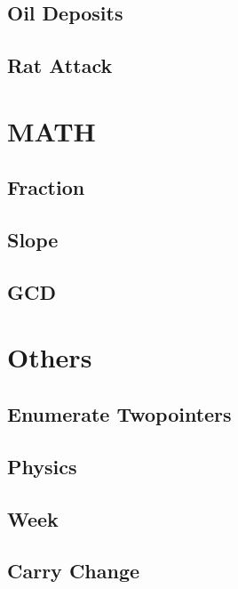     \subsection{Oil Deposits}
            
    \subsection{Rat Attack}
            

\section{MATH}
    \subsection{Fraction}
            
    \subsection{Slope}
            
    \subsection{GCD}
            

\section{Others}
    \subsection{Enumerate Twopointers}
            
    \subsection{Physics}
            
    \subsection{Week}
            
    \subsection{Carry Change}
            
